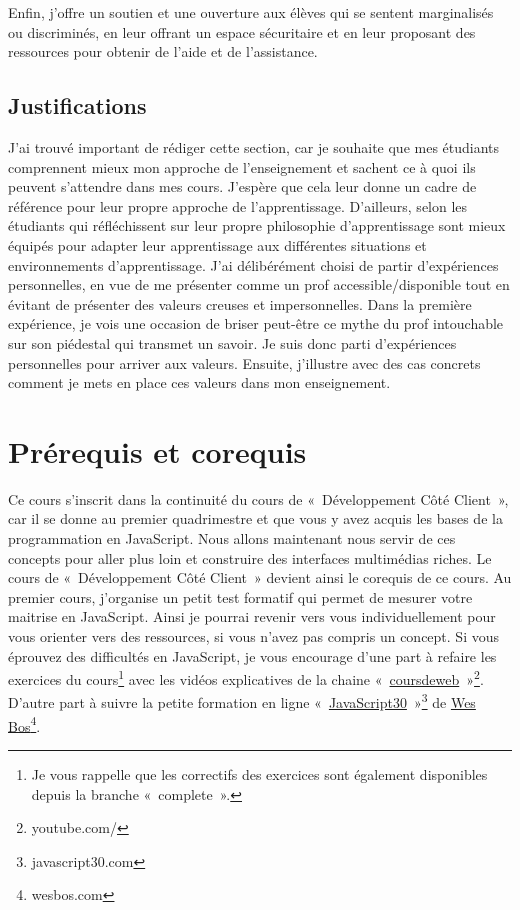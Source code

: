 Enfin, j'offre un soutien et une ouverture aux élèves qui se sentent marginalisés ou discriminés, en leur offrant un espace sécuritaire et en leur proposant des ressources pour obtenir de l'aide et de l'assistance.

\subsection{Justifications}

J’ai trouvé important de rédiger cette section, car je souhaite que mes étudiants comprennent mieux mon approche de l'enseignement et sachent ce à quoi ils peuvent s'attendre dans mes cours. J'espère que cela leur donne un cadre de référence pour leur propre approche de l'apprentissage. D’ailleurs, selon \citet{barkley2014collaborative} les étudiants qui réfléchissent sur leur propre philosophie d'apprentissage sont mieux équipés pour adapter leur apprentissage aux différentes situations et environnements d'apprentissage.
J'ai délibérément choisi de partir d'expériences personnelles, en vue de me présenter comme un prof accessible/disponible tout en évitant de présenter des valeurs creuses et impersonnelles. Dans la première expérience, je vois une occasion de briser peut-être ce mythe du prof intouchable sur son piédestal qui transmet un savoir. Je suis donc parti d'expériences personnelles pour arriver aux valeurs. Ensuite, j'illustre avec des cas concrets comment je mets en place ces valeurs dans mon enseignement.

\clearpage
\section{Prérequis et corequis}

Ce cours s’inscrit dans la continuité du cours de «~Développement Côté Client~», car il se donne au premier quadrimestre et que vous y avez acquis les bases de la programmation en JavaScript. Nous allons maintenant nous servir de ces concepts pour aller plus loin et construire des interfaces multimédias riches. Le cours de «~Développement Côté Client~» devient ainsi le corequis de ce cours.
Au premier cours, j'organise un petit test formatif qui permet de mesurer votre maitrise en JavaScript. Ainsi je pourrai revenir vers vous individuellement pour vous orienter vers des ressources, si vous n’avez pas compris un concept. Si vous éprouvez des difficultés en JavaScript, je vous encourage d’une part à refaire les exercices du cours\footnote{Je vous rappelle que les correctifs des exercices sont également disponibles depuis la branche «~complete~».} avec les vidéos explicatives de la chaine «~\href{https://www.youtube.com/@coursdeweb}{coursdeweb}~»\footnote{youtube.com/\@coursdeweb}. D’autre part à suivre la petite formation en ligne «~\href{https://javascript30.com}{JavaScript30}~»\footnote{javascript30.com} de \href{https://wesbos.com}{Wes Bos}\footnote{wesbos.com}.

